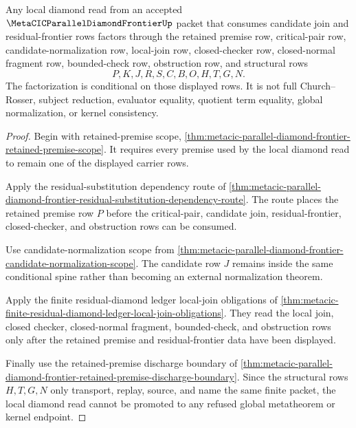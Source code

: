 \begin{theorem}
\label{thm:metacic-parallel-diamond-frontier-local-diamond-retained-premise-factorization}
Any local diamond read from an accepted $\MetaCICParallelDiamondFrontierUp$ packet that consumes candidate join and residual-frontier rows factors through the retained premise row, critical-pair row, candidate-normalization row, local-join row, closed-checker row, closed-normal fragment row, bounded-check row, obstruction row, and structural rows
$$
P,K,J,R,S,C,B,O,H,T,G,N .
$$
The factorization is conditional on those displayed rows. It is not full Church--Rosser, subject reduction, evaluator equality, quotient term equality, global normalization, or kernel consistency.
\end{theorem}
\begin{proof}
Begin with retained-premise scope, \autoref{thm:metacic-parallel-diamond-frontier-retained-premise-scope}. It requires every premise used by the local diamond read to remain one of the displayed carrier rows.

Apply the residual-substitution dependency route of \autoref{thm:metacic-parallel-diamond-frontier-residual-substitution-dependency-route}. The route places the retained premise row $P$ before the critical-pair, candidate join, residual-frontier, closed-checker, and obstruction rows can be consumed.

Use candidate-normalization scope from \autoref{thm:metacic-parallel-diamond-frontier-candidate-normalization-scope}. The candidate row $J$ remains inside the same conditional spine rather than becoming an external normalization theorem.

Apply the finite residual-diamond ledger local-join obligations of \autoref{thm:metacic-finite-residual-diamond-ledger-local-join-obligations}. They read the local join, closed checker, closed-normal fragment, bounded-check, and obstruction rows only after the retained premise and residual-frontier data have been displayed.

Finally use the retained-premise discharge boundary of \autoref{thm:metacic-parallel-diamond-frontier-retained-premise-discharge-boundary}. Since the structural rows $H,T,G,N$ only transport, replay, source, and name the same finite packet, the local diamond read cannot be promoted to any refused global metatheorem or kernel endpoint.
\end{proof}
